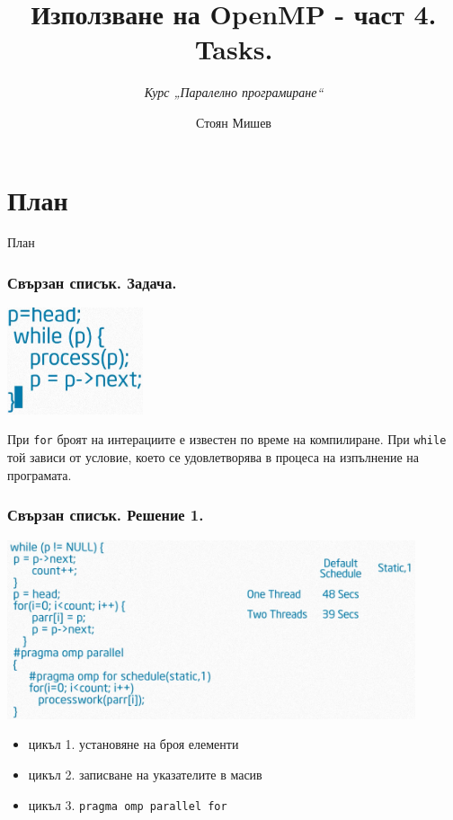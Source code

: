 \documentclass{beamer}
\title{Използване на OpenMP - част 4. Tasks.}
\subtitle{\textit{Курс „Паралелно програмиране“}}
\author{\newline \newline Стоян Мишев}
\date{} %
\begin{document}
\lstset{language=Python}
{ 
\frame{\titlepage}}


\section*{План}\begin{frame}{План}\tableofcontents\end{frame}


\begin{frame}
  \frametitle{Свързан списък. Задача.}
  \centering
  \includegraphics[width=0.3\textwidth]{while}

  \pause

  При \texttt{for} броят на интерациите е известен по време на компилиране. При \texttt{while} той зависи от условие, което се удовлетворява в процеса на изпълнение на програмата.
\end{frame}

\begin{frame}
  \frametitle{Свързан списък. Решение 1.}
  \centering
  \includegraphics[width=0.9\textwidth]{solution-naive}

  \begin{itemize}
  \item цикъл 1. установяне на броя елементи
  \item цикъл 2. записване на указателите в масив
  \item цикъл 3. \texttt{pragma omp parallel for}
  \end{itemize}

\end{frame}
\end{document}
